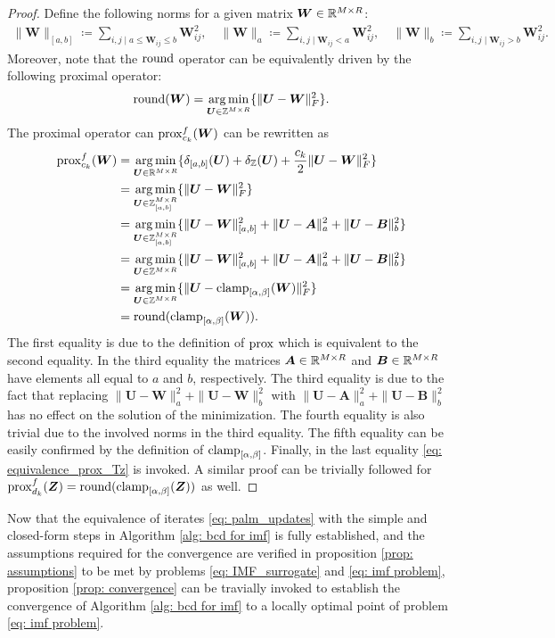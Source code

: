 \begin{proof}
    Define the following norms for a given matrix $\bm W \in \mathbb{R}^{M\times R}$:
    \begin{align*}
        \|\bm W\|_{[a,b]} \coloneqq \sum_{i,j \mid a \leq \bm W_{ij} \leq b} \bm W_{ij}^2, \quad 
        \|\bm W\|_a \coloneqq \sum_{i,j \mid \bm W_{ij} < a} \bm W_{ij}^2, \quad 
        \|\bm W\|_b \coloneqq \sum_{i,j \mid \bm W_{ij} > b} \bm W_{ij}^2.
    \end{align*}
    Moreover, note that the $\operatorname{round}$ operator  can be equivalently driven by the following proximal operator:
    \begin{equation}
        \operatorname{round}(\bm W) = \operatorname*{arg\,min}_{\bm U \in \mathbb Z^{M\times R}}\{\|\bm U - \bm W\|^2_F\}.
        \label{eq: equivalence_prox_Tz}
    \end{equation}
    The proximal operator can $\operatorname{prox}^f_{c_k}(\bm W)$ can be rewritten as
    \begin{align*}
        \operatorname{prox}^f_{c_k}(\bm W) &= \operatorname*{arg\,min}_{\bm U \in \mathbb{R}^{M\times R}}\{\delta_{[a,b]}(\bm U) + \delta_{\mathbb Z}(\bm U) + \frac{c_k}{2} \|\bm U - \bm W\|^2_F\}\\
        &= \operatorname*{arg\,min}_{\bm U \in \mathbb Z_{[a,b]}^{M\times R}}\{\|\bm U - \bm W\|^2_F\}\\
        &= \operatorname*{arg\,min}_{\bm U \in \mathbb Z_{[a,b]}^{M\times R}}\{\|\bm U - \bm W\|^2_{[a,b]} + \|\bm U - \bm A\|^2_a + \|\bm U - \bm B\|^2_b\}\\
        &= \operatorname*{arg\,min}_{\bm U \in \mathbb Z^{M\times R}}\{\|\bm U - \bm W\|^2_{[a,b]} + \|\bm U - \bm A\|^2_a + \|\bm U - \bm B\|^2_b\}\\
        &= \operatorname*{arg\,min}_{\bm U \in \mathbb Z^{M\times R}}\{\|\bm U - \operatorname{clamp}_{[\alpha,\beta]}(\bm W)\|^2_F\}\\
        &= \operatorname{round}(\operatorname{clamp}_{[\alpha,\beta]}(\bm W)).
    \end{align*}
    The first equality is due to the definition of $\operatorname{prox}$ which is equivalent to the second equality. 
    In the third equality the matrices $\bm A\in\mathbb{R}^{M\times R}$ and $\bm B\in\mathbb{R}^{M\times R}$ have elements all equal to $a$ and $b$, respectively.
    The third equality is due to the fact that replacing $\|\bm U - \bm W\|^2_a + \|\bm U - \bm W\|^2_b$ with $\|\bm U - \bm A\|^2_a + \|\bm U - \bm B\|^2_b$ has no effect on the solution of the minimization. The fourth equality is also trivial due to the involved norms in the third equality. The fifth equality can be easily confirmed by the definition of $\operatorname{clamp}_{[\alpha,\beta]}$. Finally, in the last equality \eqref{eq: equivalence_prox_Tz} is invoked. A similar proof can be trivially followed for $\operatorname{prox}^f_{d_k}(\bm Z) = \operatorname{round}(\operatorname{clamp}_{[\alpha,\beta]}(\bm Z))$ as well.
\end{proof}
Now that the equivalence of iterates \eqref{eq: palm_updates} with the simple and closed-form steps in Algorithm \ref{alg: bcd for imf} is fully established, and the assumptions required for the convergence are verified in proposition \ref{prop: assumptions} to be met by problems \eqref{eq: IMF_surrogate} and \eqref{eq: imf problem}, proposition \ref{prop: convergence} can be travially invoked to establish the convergence of Algorithm \ref{alg: bcd for imf} to a locally optimal point of problem \eqref{eq: imf problem}.


